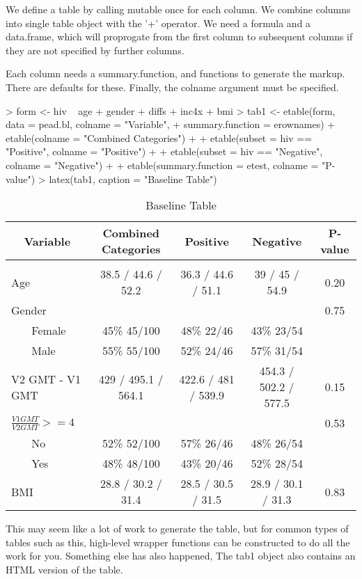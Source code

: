 \documentclass{article}
\begin{document}
We define a table by calling mutable once for each column. We combine
columns into single table object with the '+' operator. We need a
formula and a data.frame, which will proprogate from the first column
to subsequent columns if they are not specified by further columns.

Each column needs a summary.function, and functions to generate the
markup. There are defaults for these. Finally, the colname argument
must be specified.

\begin{Schunk}
\begin{Sinput}
> form <- hiv ~ age + gender + diffs + inc4x + bmi
> tab1 <- etable(form, data = pead.bl, colname = "Variable", 
+     summary.function = erownames) + etable(colname = "Combined Categories") + 
+     etable(subset = hiv == "Positive", colname = "Positive") + 
+     etable(subset = hiv == "Negative", colname = "Negative") + 
+     etable(summary.function = etest, colname = "P-value")
> latex(tab1, caption = "Baseline Table")
\end{Sinput}
\begin{table}
\begin{tabular}{lcccc}
\multicolumn{1}{c}{ Variable }&\multicolumn{1}{c}{ Combined Categories }&\multicolumn{1}{c}{ Positive }&\multicolumn{1}{c}{ Negative }&\multicolumn{1}{c}{ P-value }
\\
\hline\\ 
Age&38.5 / 44.6 / 52.2&36.3 / 44.6 / 51.1&39 / 45 / 54.9&0.20\\
Gender&&&&0.75\\
~~~ Female&45\% 45/100&48\% 22/46&43\% 23/54&\\
~~~ Male&55\% 55/100&52\% 24/46&57\% 31/54&\\
V2 GMT - V1 GMT&429 / 495.1 / 564.1&422.6 / 481 / 539.9&454.3 / 502.2 / 577.5&0.15\\
$\frac{V1 GMT}{V2 GMT} >= 4$&&&&0.53\\
~~~ No&52\% 52/100&57\% 26/46&48\% 26/54&\\
~~~ Yes&48\% 48/100&43\% 20/46&52\% 28/54&\\
BMI&28.8 / 30.2 / 31.4&28.5 / 30.5 / 31.5&28.9 / 30.1 / 31.3&0.83 \\
\end{tabular}
\caption{Baseline Table}
\end{table} \end{Schunk}

This may seem like a lot of work to generate the table, but for common
types of tables such as this, high-level wrapper functions can be 
constructed to do all the work for you.  Something else has also happened,
The tab1 object also contains an HTML version of the table.
\end{document}
